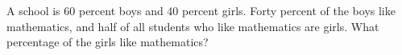 A school is 60 percent boys and 40 percent girls. Forty percent of the boys like mathematics, and half of all students who like mathematics are girls. What percentage of the girls like mathematics?

